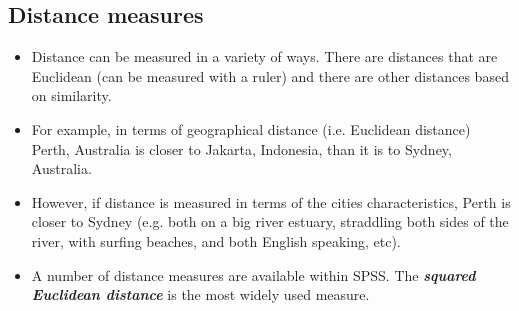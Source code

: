 \documentclass[a4paper,12pt]{report}
\begin{document}
\subsection{Distance measures}
\begin{itemize}
\item Distance can be measured in a variety of ways. There are distances that are Euclidean (can be measured with a ruler) and there are other distances based on similarity.
\item  For example, in terms of
geographical distance (i.e. Euclidean distance) Perth, Australia is closer to Jakarta, Indonesia, than it is to Sydney, Australia.
\item 
However, if distance is measured in terms of the cities characteristics, Perth is closer to Sydney (e.g. both on a big river estuary, straddling both sides of the river, with surfing beaches, and both English speaking, etc). 
\item A number of distance measures are available within SPSS. The \textbf{\textit{squared Euclidean distance}} is the most widely used measure.
\end{itemize}
\end{document}
